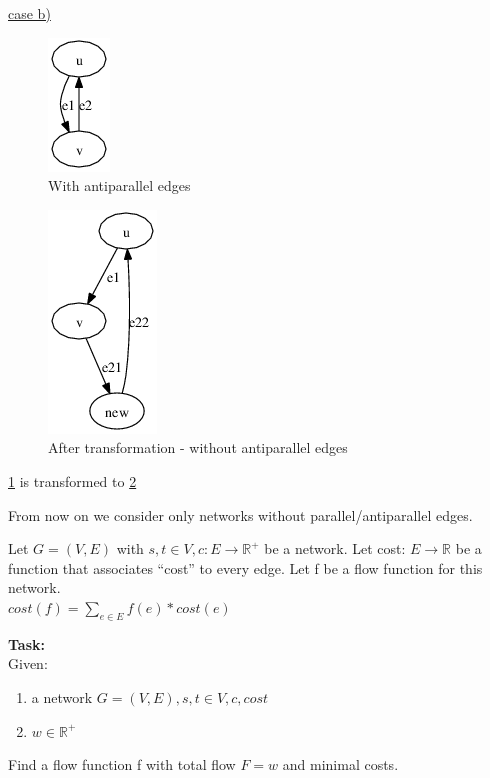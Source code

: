 \begin{example}
\underline{case b)}\\

\begin{figure}[h]
\includegraphics[scale=0.45]{diagrams/graph5_1}
\caption{With antiparallel edges}
\label{fig:G3}
\end{figure}

\begin{figure}[h]
\includegraphics[scale=0.45]{diagrams/graph5_3}
\caption{After transformation - without antiparallel edges}
\label{fig:G4}
\end{figure}

\ref{fig:G3} is transformed to \ref{fig:G4}\\
\end{example}

From now on we consider only networks without parallel/antiparallel edges.

\begin{definition}
Let $G=(V,E)$ with $s, t \in V, c: E \rightarrow \mathbb{R^+}$ be a network. Let cost: $E \rightarrow \mathbb{R}$ be a function that associates ``cost'' to every edge.
Let f be a flow function for this network. \\

$cost(f) = \sum\limits_{e \in E} f(e) * cost(e)$\\

\end{definition}


\textbf{Task:}\\
Given:
\begin{enumerate}
  \item a network $G=(V,E), s, t \in V, c, cost$
  \item $w \in \mathbb{R^+}$
\end{enumerate}
Find a flow function f with total flow $F=w$ and minimal costs.


